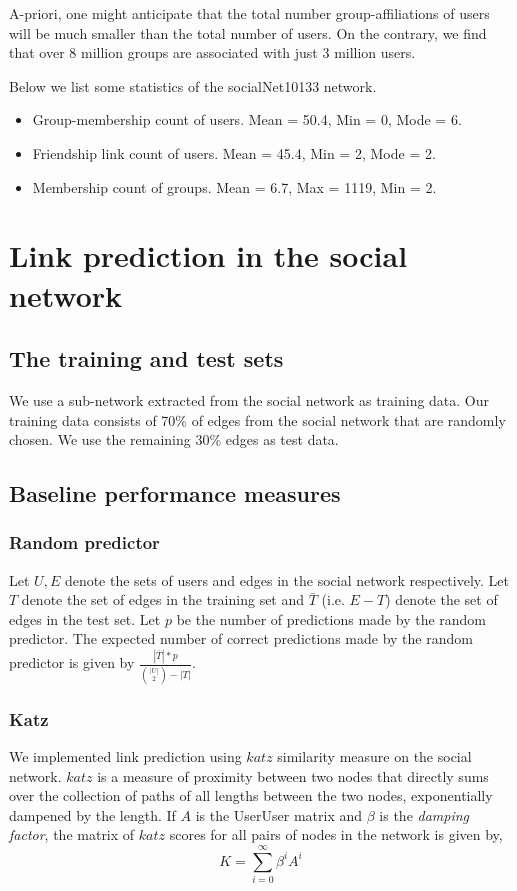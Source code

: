 \documentclass{report}
\begin{document}
A-priori, one might anticipate that the total number group-affiliations of users will be much smaller than the total number of users. On the contrary, we find that over 8 million groups are associated with just 3 million users.

Below we list some statistics of the socialNet10133 network.
\begin{itemize}
 \item Group-membership count of users. Mean = 50.4, Min = 0, Mode = 6.
 \item Friendship link count of users. Mean = 45.4, Min = 2, Mode = 2.
 \item Membership count of groups. Mean = 6.7, Max = 1119, Min = 2.
\end{itemize}


\chapter{Link prediction in the social network}
\section{The training and test sets}
We use a sub-network extracted from the social network as training data. Our training data consists of 70\% of edges from the social network that are randomly chosen. We use the remaining 30\% edges as test data.

\section{Baseline performance measures}
\subsection{Random predictor}
Let $U, E$ denote the sets of users and edges in the social network respectively. Let $T$ denote the set of edges in the training set and $\bar{T}$ (i.e. $E - T$) denote the set of edges in the test set. Let $p$ be the number of predictions made by the random predictor. The expected number of correct predictions made by the random predictor is given by $\frac{|\bar{T}|*p}{\binom{|U|}{2}-|T|}$.

\subsection{Katz}
We implemented link prediction using $katz$ similarity measure on the social network. $katz$ is a measure of proximity between two nodes that directly sums over the collection of paths of all lengths between the two nodes, exponentially dampened by the length. If $A$ is the UserUser matrix and $\beta$ is the \textit{damping factor}, the matrix of $katz$ scores for all pairs of nodes in the network is given by,
\begin{equation*}
K = \sum_{i=0}^{\infty}\beta^iA^i 
\end{equation*}
\end{document}
